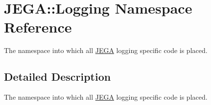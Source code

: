 \hypertarget{namespaceJEGA_1_1Logging}{}\section{J\+E\+GA\+:\+:Logging Namespace Reference}
\label{namespaceJEGA_1_1Logging}


The namespace into which all \hyperlink{namespaceJEGA}{J\+E\+GA} logging specific code is placed.  




\subsection{Detailed Description}
The namespace into which all \hyperlink{namespaceJEGA}{J\+E\+GA} logging specific code is placed. 